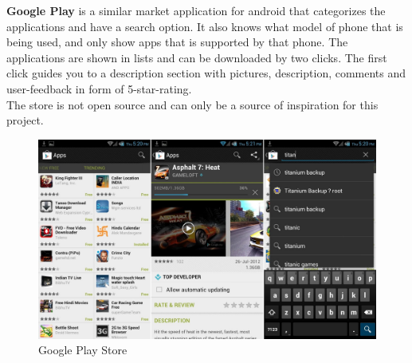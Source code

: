 {\bf Google Play} is a similar market application for android that categorizes the applications and have a search option. It also knows what model of phone that is being used, and only show apps that is supported by that phone. The applications are shown in lists and can be downloaded by two clicks. The first click guides you to a description section with pictures, description, comments and user-feedback in form of 5-star-rating.\\
The store is not open source and can only be a source of inspiration for this project.
\begin{figure}[H]
\includegraphics[scale=0.2]{images/Google-Play-Store-APK-3-7-15.jpg}
\caption{Google Play Store}
\end{figure}

